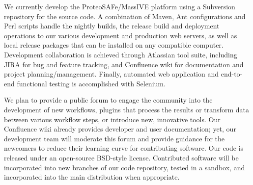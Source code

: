 \documentclass[arial,11pt]{article}
\begin{document}
%
%
%
%
%
%

We currently develop the ProteoSAFe/MassIVE platform using a Subversion repository for the source code. A combination of Maven, Ant configurations and Perl scripts handle the nightly builds, the release build and deployment operations to our various development and production web servers, as well as local release packages that can be installed on any compatible computer.  Development collaboration is achieved through Atlassian tool suite, including JIRA for bug and feature tracking, and Confluence wiki for documentation and project planning/management.  Finally, automated web application and end-to-end functional testing is accomplished with Selenium.

We plan to provide a public forum to engage the community into the development of new workflows, plugins that process the results or transform data between various workflow steps, or introduce new, innovative tools. Our Confluence wiki already provides developer and user documentation; yet, our development team will moderate this forum and provide guidance for the newcomers to reduce their learning curve for contributing software. Our code is released under an open-source BSD-style license. Contributed software will be incorporated into new branches of our code repository, tested in a sandbox, and incorporated into the main distribution when appropriate.
\end{document}
